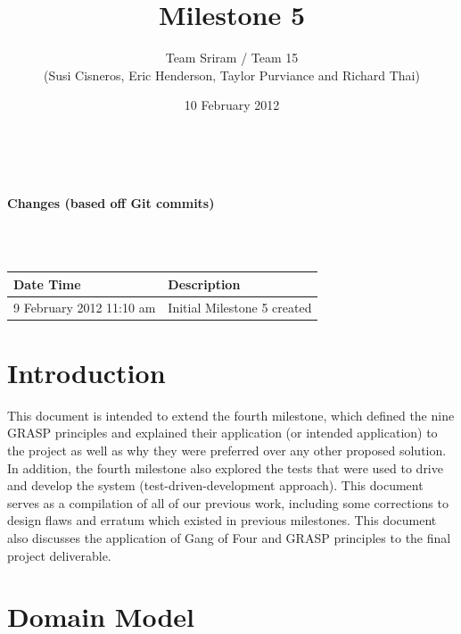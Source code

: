 \documentclass{article}
\begin{document}
\setlength{\voffset}{3.5in}
\title{Milestone 5}
\author{Team Sriram / Team 15\\
(Susi Cisneros, Eric Henderson, Taylor Purviance and Richard Thai)}
\date{10 February 2012}
\maketitle
\clearpage
\setlength{\voffset}{0pt}
\tableofcontents
\clearpage
~\\
\begin{Large}\textbf{Changes (based off Git commits)}\end{Large}\\
~\\
\begin{tabular}{ | p{2in} | p{4.5in} | }
\hline
\textbf{Date Time} & \textbf{Description}\\
\hline
\hline
9 February 2012 11:10 am & Initial Milestone 5 created\\
\hline
\end{tabular}

\clearpage

\section{Introduction}
This document is intended to extend the fourth milestone, which defined the nine GRASP principles and explained their application (or intended application) to the project as well as why they were preferred over any other proposed solution.  In addition, the fourth milestone also explored the tests that were used to drive and develop the system (test-driven-development approach).  This document serves as a compilation of all of our previous work, including some corrections to design flaws and erratum which existed in previous milestones.  This document also discusses the application of Gang of Four and GRASP principles to the final project deliverable.\\

\section{Domain Model}
\end{document}
